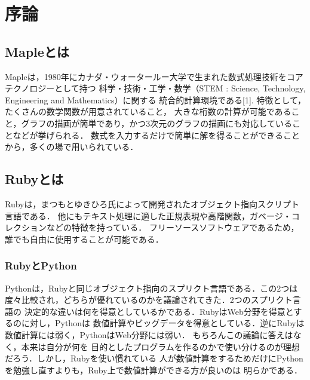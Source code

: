 \section{序論}
\subsection{Mapleとは}
Mapleは，1980年にカナダ・ウォータールー大学で生まれた数式処理技術をコアテクノロジーとして持つ
科学・技術・工学・数学（STEM : Science, Technology, Engineering and Mathematics）に関する
統合的計算環境である[1].
特徴として，たくさんの数学関数が用意されていること，
大きな桁数の計算が可能であること，グラフの描画が簡単であり，かつ3次元のグラフの描画にも対応していることなどが挙げられる．
数式を入力するだけで簡単に解を得ることができることから，多くの場で用いられている．

\subsection{Rubyとは}
Rubyは，まつもとゆきひろ氏によって開発されたオブジェクト指向スクリプト言語である．
他にもテキスト処理に適した正規表現や高階関数，ガベージ・コレクションなどの特徴を持っている．
フリーソースソフトウェアであるため，誰でも自由に使用することが可能である．

\subsubsection{RubyとPython}
Pythonは，Rubyと同じオブジェクト指向のスプリクト言語である．この2つは
度々比較され，どちらが優れているのかを議論されてきた．2つのスプリクト言語の
決定的な違いは何を得意としているかである．RubyはWeb分野を得意とするのに対し，Pythonは
数値計算やビッグデータを得意としている．逆にRubyは数値計算には弱く，PythonはWeb分野には弱い．
もちろんこの議論に答えはなく，本来は自分が何を
目的としたプログラムを作るのかで使い分けるのが理想だろう．しかし，Rubyを使い慣れている
人が数値計算をするためだけにPythonを勉強し直すよりも，Ruby上で数値計算ができる方が良いのは
明らかである．


